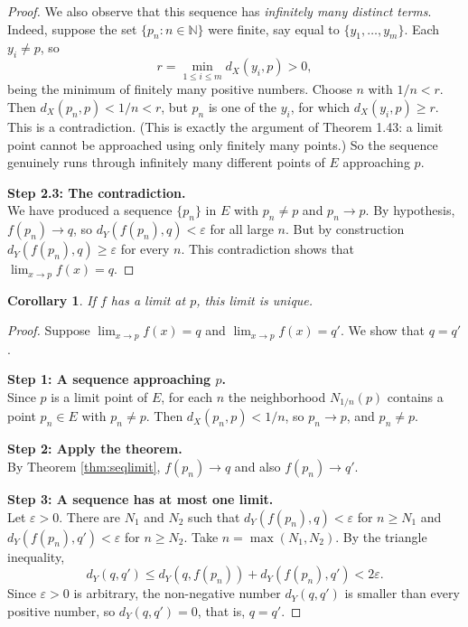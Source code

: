 \documentclass{article}
\theoremstyle{mythm}
\newtheorem{corollary}{Corollary}[theorem]
\begin{document}
\begin{proof}
We also observe that this sequence has \textit{infinitely many distinct terms}. Indeed, suppose the set $\{p_n : n \in \mathbb{N}\}$ were finite, say equal to $\{y_1, \dots, y_m\}$. Each $y_i \neq p$, so
\[
r = \min_{1 \leq i \leq m} d_X(y_i, p) > 0,
\]
being the minimum of finitely many positive numbers. Choose $n$ with $1/n < r$. Then $d_X(p_n,p) < 1/n < r$, but $p_n$ is one of the $y_i$, for which $d_X(y_i,p) \geq r$. This is a contradiction. (This is exactly the argument of Theorem 1.43: a limit point cannot be approached using only finitely many points.) So the sequence genuinely runs through infinitely many different points of $E$ approaching $p$.

\textbf{Step 2.3: The contradiction.}\\
We have produced a sequence $\{p_n\}$ in $E$ with $p_n \neq p$ and $p_n \to p$. By hypothesis, $f(p_n) \to q$, so $d_Y(f(p_n), q) < \varepsilon$ for all large $n$. But by construction $d_Y(f(p_n),q) \geq \varepsilon$ for every $n$. This contradiction shows that $\lim_{x\to p} f(x) = q$.
\end{proof}

\begin{corollary}\label{cor:unique}
If $f$ has a limit at $p$, this limit is unique.
\end{corollary}

\begin{proof}
Suppose $\lim_{x\to p} f(x) = q$ and $\lim_{x\to p} f(x) = q'$. We show that $q = q'$.

\textbf{Step 1: A sequence approaching $p$.}\\
Since $p$ is a limit point of $E$, for each $n$ the neighborhood $N_{1/n}(p)$ contains a point $p_n \in E$ with $p_n \neq p$. Then $d_X(p_n,p) < 1/n$, so $p_n \to p$, and $p_n \neq p$.

\textbf{Step 2: Apply the theorem.}\\
By Theorem \ref{thm:seqlimit}, $f(p_n) \to q$ and also $f(p_n) \to q'$.

\textbf{Step 3: A sequence has at most one limit.}\\
Let $\varepsilon > 0$. There are $N_1$ and $N_2$ such that $d_Y(f(p_n), q) < \varepsilon$ for $n \geq N_1$ and $d_Y(f(p_n), q') < \varepsilon$ for $n \geq N_2$. Take $n = \max(N_1, N_2)$. By the triangle inequality,
\[
d_Y(q, q') \leq d_Y(q, f(p_n)) + d_Y(f(p_n), q') < 2\varepsilon.
\]
Since $\varepsilon > 0$ is arbitrary, the non-negative number $d_Y(q,q')$ is smaller than every positive number, so $d_Y(q,q') = 0$, that is, $q = q'$.
\end{proof}
\end{document}
